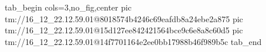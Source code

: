  
 
 
 
 

\qqSecOrig


\ifcmt
  tab_begin cols=3,no_fig,center
    pic tm://16_12_22.12.59.01@8018574b4246c69eafdb8a24ebe2a875
    pic tm://16_12_22.12.59.01@15d127ee842421564bce9c6e8a8c60d5
    pic tm://16_12_22.12.59.01@14f7701164e2ee0bb17988b46f989b5c
  tab_end
\fi

